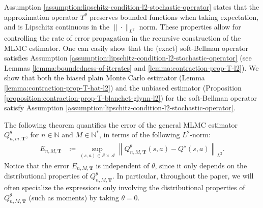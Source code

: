 \documentclass[11pt]{article}
\numberwithin{equation}{section}
\theoremstyle{definition}
\theoremstyle{remark}
\def\N{{\mathbb{N}}}
\begin{document}
Assumption \ref{assumption:lipschitz-condition-l2-stochastic-operator}
states that 
the approximation operator 
$T^\theta$ preserves bounded functions when taking expectation,
and is Lipschitz continuous in the $\|\cdot\|_{L^2}$ norm.
These properties 
allow for controlling the rate of error propagation in the recursive construction of the MLMC estimator.
 One can easily show that 
the (exact) soft-Bellman operator
satisfies Assumption \ref{assumption:lipschitz-condition-l2-stochastic-operator} (see  
   Lemmas \ref{lemma:boundedness-of-iterates} and   \ref{lemma:contraction-prop-T-l2}).
We show that both the biased  plain Monte Carlo estimator  
(Lemma \ref{lemma:contraction-prop-T-hat-l2})
  and the unbiased estimator     (Proposition \ref{proposition:contraction-prop-T-blanchet-glynn-l2})
  for the soft-Bellman operator 
  satisfy Assumption \ref{assumption:lipschitz-condition-l2-stochastic-operator}.

 

 
 

 The following theorem quantifies the error     of  the general MLMC estimator $Q^\theta_{n,m,\mathbf T}$,
 for $n\in \N$ and $M\in \N^*$,
 in terms of the  following  $L^2$-norm:
\begin{equation}
    \label{eq:definition-error-l2}
    \begin{aligned}
        E_{n,M, \mathbf T} & \coloneqq \sup_{(s,a) \in \mathcal S \times \mathcal A} \left\| Q^\theta_{n,M, \mathbf T}(s,a) - Q^\star(s,a) \right\|_{L^2}.
    \end{aligned}
\end{equation}
Notice that the error $E_{n,M, \mathbf T}$ is independent of $\theta$, since it only depends on the distributional properties of $Q^\theta_{n,M,\mathbf T}$. In particular, throughout the paper, we will often specialize the expressions only involving the distributional properties of $Q^\theta_{n,M,\mathbf T}$ (such as moments) by taking $\theta = 0$.
\end{document}
